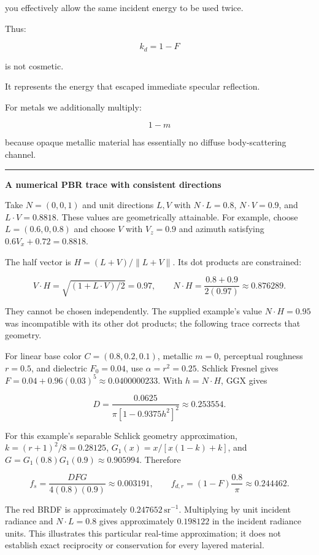 you effectively allow the same incident energy to be used twice.

Thus:

\[
k_d=1-F
\]

is not cosmetic.

It represents the energy that escaped immediate specular reflection.

For metals we additionally multiply:

\[
1-m
\]

because opaque metallic material has essentially no diffuse body-scattering channel.

\begin{center}\rule{0.5\linewidth}{0.5pt}\end{center}

\textbf{A numerical PBR trace with consistent directions}

Take \(N=(0,0,1)\) and unit directions \(L,V\) with \(N\cdot L=0.8\), \(N\cdot V=0.9\), and \(L\cdot V=0.8818\). These values are geometrically attainable. For example, choose \(L=(0.6,0,0.8)\) and choose \(V\) with \(V_z=0.9\) and azimuth satisfying \(0.6V_x+0.72=0.8818\).

The half vector is \(H=(L+V)/\|L+V\|\). Its dot products are constrained:

\[
V\cdot H=\sqrt{(1+L\cdot V)/2}=0.97,
\qquad N\cdot H=\frac{0.8+0.9}{2(0.97)}\approx0.876289.
\]

They cannot be chosen independently. The supplied example's value \(N\cdot H=0.95\) was incompatible with its other dot products; the following trace corrects that geometry.

For linear base color \(C=(0.8,0.2,0.1)\), metallic \(m=0\), perceptual roughness \(r=0.5\), and dielectric \(F_0=0.04\), use \(\alpha=r^2=0.25\). Schlick Fresnel gives \(F=0.04+0.96(0.03)^5\approx0.0400000233\). With \(h=N\cdot H\), GGX gives

\[
D=\frac{0.0625}{\pi[1-0.9375h^2]^2}\approx0.253554.
\]

For this example's separable Schlick geometry approximation, \(k=(r+1)^2/8=0.28125\), \(G_1(x)=x/[x(1-k)+k]\), and \(G=G_1(0.8)G_1(0.9)\approx0.905994\). Therefore

\[
f_s=\frac{DFG}{4(0.8)(0.9)}\approx0.003191,
\qquad f_{d,r}=(1-F)\frac{0.8}{\pi}\approx0.244462.
\]

The red BRDF is approximately \(0.247652\,\mathrm{sr}^{-1}\). Multiplying by unit incident radiance and \(N\cdot L=0.8\) gives approximately \(0.198122\) in the incident radiance units. This illustrates this particular real-time approximation; it does not establish exact reciprocity or conservation for every layered material.

